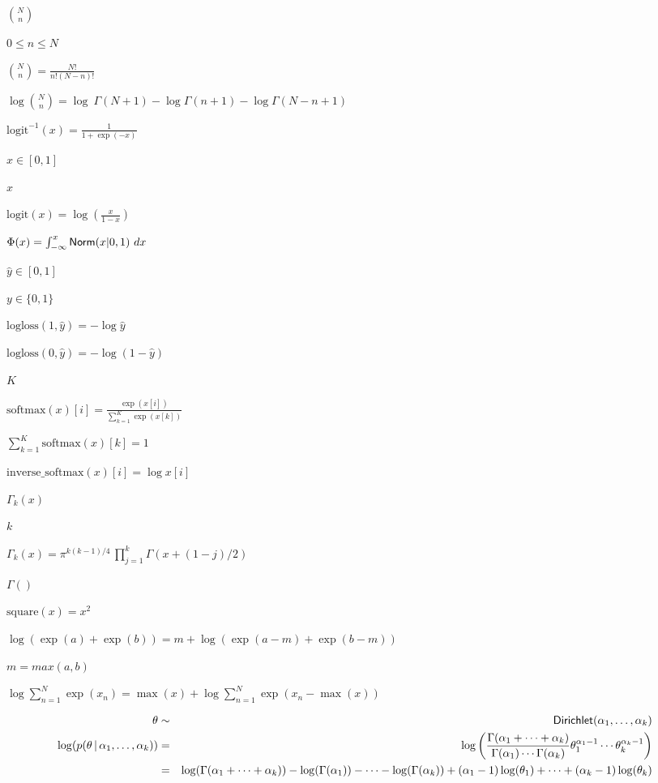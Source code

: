 \documentclass{article}
\begin{document}
${N \choose n}$
\pagebreak

$0 \leq n \leq N$
\pagebreak

${N \choose n} = \frac{N!}{n! (N-n)!}$
\pagebreak

$ \log {N \choose n} = \log \ \Gamma(N+1) - \log \Gamma(n+1) - \log \Gamma(N-n+1)$
\pagebreak

$\mbox{logit}^{-1}(x) = \frac{1}{1 + \exp(-x)}$
\pagebreak

$x \in [0,1]$
\pagebreak

$x$
\pagebreak

$\mbox{logit}(x) = \log \left( \frac{x}{1 - x} \right)$
\pagebreak

$\Phi(x) = \int_{-\infty}^x \mbox{\sf Norm}(x|0,1) \ dx$
\pagebreak

$\hat{y} \in [0, 1]$
\pagebreak

$y \in \{ 0, 1 \}$
\pagebreak

$\mbox{logloss}(1,\hat{y}) = -\log \hat{y} $
\pagebreak

$\mbox{logloss}(0,\hat{y}) = -\log (1 - \hat{y}) $
\pagebreak

$K$
\pagebreak

$\mbox{softmax}(x)[i] = \frac{\exp(x[i])}{\sum_{k=1}^{K} \exp(x[k])}$
\pagebreak

$ \sum_{k=1}^{K} \mbox{softmax}(x)[k] = 1$
\pagebreak

$\mbox{inverse\_softmax}(x)[i] = \log x[i]$
\pagebreak

$\Gamma_k(x)$
\pagebreak

$k$
\pagebreak

$\Gamma_k(x) = \pi^{k(k-1)/4} \, \prod_{j=1}^k \Gamma(x + (1 - j)/2)$
\pagebreak

$\Gamma()$
\pagebreak

$\mbox{square}(x) = x^2$
\pagebreak

$\log (\exp(a) + \exp(b)) = m + \log(\exp(a-m) + \exp(b-m))$
\pagebreak

$m = max(a,b)$
\pagebreak

$\log \sum_{n=1}^N \exp(x_n) = \max(x) + \log \sum_{n=1}^N \exp(x_n - \max(x))$
\pagebreak

\begin{eqnarray*} \theta &\sim& \mbox{\sf{Dirichlet}} (\alpha_1, \ldots, \alpha_k) \\ \log (p (\theta \,|\, \alpha_1, \ldots, \alpha_k) ) &=& \log \left( \frac{\Gamma(\alpha_1 + \cdots + \alpha_k)}{\Gamma(\alpha_1) \cdots \Gamma(\alpha_k)} \theta_1^{\alpha_1 - 1} \cdots \theta_k^{\alpha_k - 1} \right) \\ &=& \log (\Gamma(\alpha_1 + \cdots + \alpha_k)) - \log(\Gamma(\alpha_1)) - \cdots - \log(\Gamma(\alpha_k)) + (\alpha_1 - 1) \log (\theta_1) + \cdots + (\alpha_k - 1) \log (\theta_k) \end{eqnarray*}
\pagebreak
\end{document}
